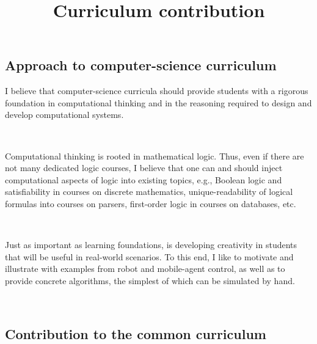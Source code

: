 \documentclass[10,a4paper,sans]{moderncv}
\title{Curriculum contribution}                               %
\begin{document}
\makecvtitle


% 
% 
% 
% 





\subsection{Approach to computer-science curriculum}
I believe that computer-science curricula should provide students with a rigorous foundation in computational thinking and in the reasoning required to design and develop computational systems. 

\

Computational thinking is rooted in mathematical logic. Thus, even if there are not many dedicated logic courses, I believe that one can and should inject computational aspects of logic into existing topics, e.g., Boolean logic and satisfiability in courses on discrete mathematics, unique-readability of logical formulas into courses on parsers, first-order logic in courses on databases, etc. 

\

Just as important as learning foundations, is developing creativity in students that will be useful in real-world scenarios. To this end, I like to motivate and illustrate with examples from robot and mobile-agent control, as well as to provide concrete algorithms, the simplest of which can be simulated by hand.

\


\subsection{Contribution to the common curriculum}
\end{document}
